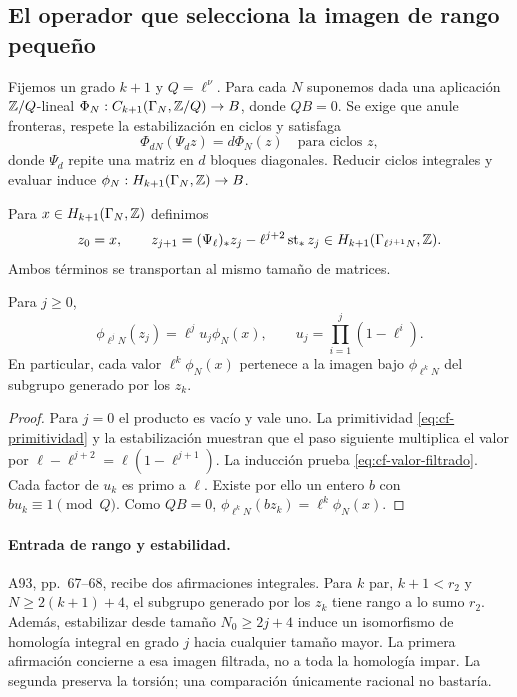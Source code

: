 \subsection{El operador que selecciona la imagen de rango pequeño}

Fijemos un grado $k+1$ y $Q=\ell^\nu$. Para cada $N$ suponemos
dada una aplicación $\mathbb{Z}/Q$-lineal
$\Phi_N:C_{k+1}(\Gamma_N,\mathbb{Z}/Q)\to B$, donde $QB=0$.
Se exige que anule fronteras, respete la estabilización en ciclos
y satisfaga
\begin{equation}
 \Phi_{dN}(\Psi_d z)=d\Phi_N(z)
 \quad\text{para ciclos }z,
 \label{eq:cf-primitividad}
\end{equation}
donde $\Psi_d$ repite una matriz en $d$ bloques diagonales.
Reducir ciclos integrales y evaluar induce
$\phi_N:H_{k+1}(\Gamma_N,\mathbb{Z})\to B$.

Para $x\in H_{k+1}(\Gamma_N,\mathbb{Z})$ definimos
\begin{equation}
 z_0=x,\qquad
 z_{j+1}=(\Psi_\ell)_*z_j-\ell^{j+2}\operatorname{st}_*z_j
 \in H_{k+1}(\Gamma_{\ell^{j+1}N},\mathbb{Z}).
 \label{eq:cf-filtrado}
\end{equation}
Ambos términos se transportan al mismo tamaño de matrices.

\begin{lema}
\label{lem:cf-filtrado}
Para $j\ge0$,
\begin{equation}
 \phi_{\ell^jN}(z_j)
 =\ell^j u_j\phi_N(x),\qquad
 u_j=\prod_{i=1}^j(1-\ell^i).
 \label{eq:cf-valor-filtrado}
\end{equation}
En particular, cada valor $\ell^k\phi_N(x)$ pertenece a la
imagen bajo $\phi_{\ell^kN}$ del subgrupo generado por los $z_k$.
\end{lema}

\begin{proof}
Para $j=0$ el producto es vacío y vale uno. La primitividad
\eqref{eq:cf-primitividad} y la estabilización muestran que
el paso siguiente multiplica el valor por
$\ell-\ell^{j+2}=\ell(1-\ell^{j+1})$.
La inducción prueba \eqref{eq:cf-valor-filtrado}.
Cada factor de $u_k$ es primo a $\ell$. Existe por ello un entero
$b$ con $bu_k\equiv1\pmod Q$. Como $QB=0$,
$\phi_{\ell^kN}(bz_k)=\ell^k\phi_N(x)$.
\end{proof}

\paragraph{Entrada de rango y estabilidad.}
A93, pp.~67--68, recibe dos afirmaciones integrales. Para $k$ par,
$k+1<r_2$ y $N\ge2(k+1)+4$, el subgrupo generado por los $z_k$
tiene rango a lo sumo $r_2$. Además, estabilizar desde tamaño
$N_0\ge2j+4$ induce un isomorfismo de homología integral en
grado $j$ hacia cualquier tamaño mayor.
La primera afirmación concierne a esa imagen filtrada, no a toda
la homología impar. La segunda preserva la torsión; una
comparación únicamente racional no bastaría.

